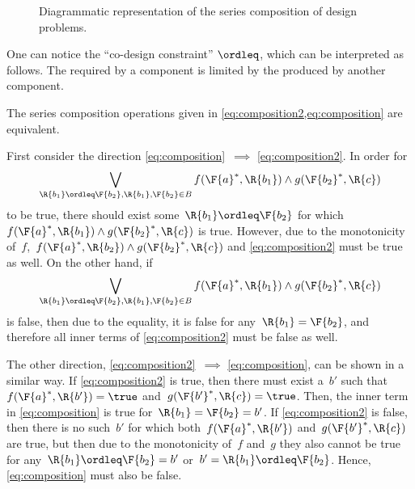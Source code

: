 \begin{figure}[h!]
    \begin{center}
    \end{center}
    \caption{Diagrammatic representation of the series composition of design problems. \label{fig:compositiondiagram}}
\end{figure}

One can notice the ``co-design constraint'' $\ordleq$, which can be interpreted as follows. The  required by a component is limited by the  produced by another component.

\begin{remark}
    \label{lem:composition_equivalency}
    The series composition operations given in \cref{eq:composition2,eq:composition} are equivalent.


    First consider the direction \cref{eq:composition}~$\implies$ \cref{eq:composition2}. In order for
    \begin{equation*}
        \bigvee_{\R{b_1}\ordleq\F{b_2}, \R{b_1},\F{b_2}\in B} f(\F{a}^*,\R{b_1}) \wedge g(\F{b_2}^*,\R{c})
    \end{equation*}
    to be true, there should exist some~$\R{b_1}\ordleq \F{b_2}$ for which~$f(\F{a}^*,\R{b_1}) \wedge g(\F{b_2}^*,\R{c})$ is true. However, due to the monotonicity of~$f$,~$f(\F{a}^*,\R{b_2}) \wedge g(\F{b_2}^*,\R{c})$ and \cref{eq:composition2} must be true as well. On the other hand, if
    \begin{equation*}
        \bigvee_{\R{b_1}\ordleq\F{b_2}, \R{b_1},\F{b_2}\in B} f(\F{a}^*,\R{b_1}) \wedge g(\F{b_2}^*,\R{c})
    \end{equation*}
    is false, then due to the equality, it is false for any~$\R{b_1}=\F{b_2}$, and therefore all inner terms of \cref{eq:composition2} must be false as well.

    The other direction, \cref{eq:composition2}~$\implies$ \cref{eq:composition}, can be shown in a similar way. If \cref{eq:composition2} is true, then there must exist a~$b'$ such that~$f(\F{a}^*, \R{b'})=\true$ and~$g(\F{b'}^*, \R{c})=\true$. Then, the inner term in \cref{eq:composition} is true for~$\R{b_1}=\F{b_2}=b'$. If \cref{eq:composition2} is false, then there is no such~$b'$ for which both~$f(\F{a}^*, \R{b'})$ and~$g(\F{b'}^*, \R{c})$ are true, but then due to the monotonicity of~$f$ and~$g$ they also cannot be true for any~$\R{b_1} \ordleq \F{b_2} = b'$ or~$b'=\R{b_1} \ordleq \F{b_2}$. Hence, \cref{eq:composition} must also be false.
\end{remark}
